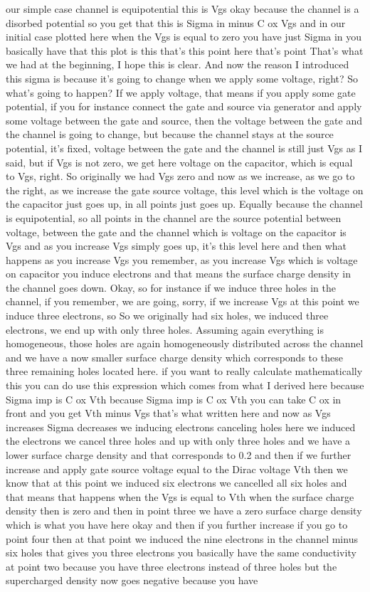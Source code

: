 our simple case channel is equipotential this is Vgs okay because the channel is a disorbed potential so you get that this is Sigma in minus C ox Vgs and in our initial case plotted here when the Vgs is equal to zero you have just Sigma in you basically have that this plot is this that's this point here that's point That's what we had at the beginning, I hope this is clear. And now the reason I introduced this sigma is because it's going to change when we apply some voltage, right? So what's going to happen? If we apply voltage, that means if you apply some gate potential, if you for instance connect the gate and source via generator and apply some voltage between the gate and source, then the voltage between the gate and the channel is going to change, but because the channel stays at the source potential, it's fixed, voltage between the gate and the channel is still just Vgs as I said, but if Vgs is not zero, we get here voltage on the capacitor, which is equal to Vgs, right. So originally we had Vgs zero and now as we increase, as we go to the right, as we increase the gate source voltage, this level which is the voltage on the capacitor just goes up, in all points just goes up. Equally because the channel is equipotential, so all points in the channel are the source potential between voltage, between the gate and the channel which is voltage on the capacitor is Vgs and as you increase Vgs simply goes up, it's this level here and then what happens as you increase Vgs you remember, as you increase Vgs which is voltage on capacitor you induce electrons and that means the surface charge density in the channel goes down. Okay, so for instance if we induce three holes in the channel, if you remember, we are going, sorry, if we increase Vgs at this point we induce three electrons, so So we originally had six holes, we induced three electrons, we end up with only three holes. Assuming again everything is homogeneous, those holes are again homogeneously distributed across the channel and we have a now smaller surface charge density which corresponds to these three remaining holes located here. if you want to really calculate mathematically this you can do use this expression which comes from what I derived here because Sigma imp is C ox Vth because Sigma imp is C ox Vth you can take C ox in front and you get Vth minus Vgs that's what written here and now as Vgs increases Sigma decreases we inducing electrons canceling holes here we induced the electrons we cancel three holes and up with only three holes and we have a lower surface charge density and that corresponds to 0.2 and then if we further increase and apply gate source voltage equal to the Dirac voltage Vth then we know that at this point we induced six electrons we cancelled all six holes and that means that happens when the Vgs is equal to Vth when the surface charge density then is zero and then in point three we have a zero surface charge density which is what you have here okay and then if you further increase if you go to point four then at that point we induced the nine electrons in the channel minus six holes that gives you three electrons you basically have the same conductivity at point two because you have three electrons instead of three holes but the supercharged density now goes negative because you have 
